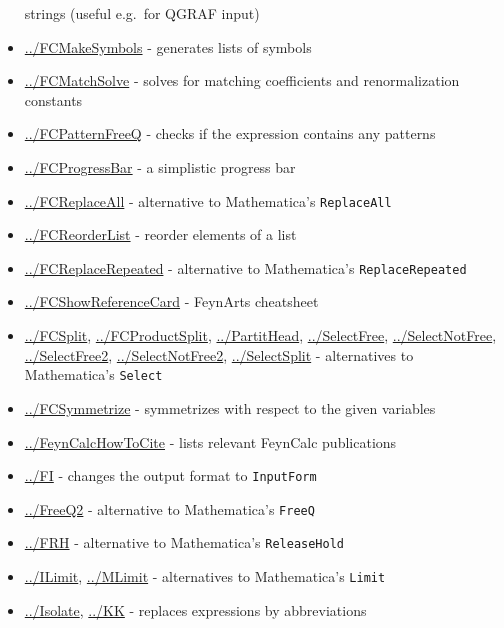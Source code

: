\documentclass[../FeynCalcManual.tex]{subfiles}
\begin{document}
\begin{itemize}
  strings (useful e.g.~for QGRAF input)
\item
  \hyperlink{../fcmakesymbols}{../FCMakeSymbols} - generates lists of
  symbols
\item
  \hyperlink{../fcmatchsolve}{../FCMatchSolve} - solves for matching
  coefficients and renormalization constants
\item
  \hyperlink{../fcpatternfreeq}{../FCPatternFreeQ} - checks if the
  expression contains any patterns
\item
  \hyperlink{../fcprogressbar}{../FCProgressBar} - a simplistic progress
  bar
\item
  \hyperlink{../fcreplaceall}{../FCReplaceAll} - alternative to
  Mathematica's \texttt{ReplaceAll}
\item
  \hyperlink{../fcreorderlist}{../FCReorderList} - reorder elements of a
  list
\item
  \hyperlink{../fcreplacerepeated}{../FCReplaceRepeated} - alternative
  to Mathematica's \texttt{ReplaceRepeated}
\item
  \hyperlink{../fcshowreferencecard}{../FCShowReferenceCard} - FeynArts
  cheatsheet
\item
  \hyperlink{../fcsplit}{../FCSplit},
  \hyperlink{../fcproductsplit}{../FCProductSplit},
  \hyperlink{../partithead}{../PartitHead},
  \hyperlink{../selectfree}{../SelectFree},
  \hyperlink{../selectnotfree}{../SelectNotFree},
  \hyperlink{../selectfree2}{../SelectFree2},
  \hyperlink{../selectnotfree2}{../SelectNotFree2},
  \hyperlink{../selectsplit}{../SelectSplit} - alternatives to
  Mathematica's \texttt{Select}
\item
  \hyperlink{../fcsymmetrize}{../FCSymmetrize} - symmetrizes with
  respect to the given variables
\item
  \hyperlink{../feyncalchowtocite}{../FeynCalcHowToCite} - lists
  relevant FeynCalc publications
\item
  \hyperlink{../fi}{../FI} - changes the output format to
  \texttt{InputForm}
\item
  \hyperlink{../freeq2}{../FreeQ2} - alternative to Mathematica's
  \texttt{FreeQ}
\item
  \hyperlink{../frh}{../FRH} - alternative to Mathematica's
  \texttt{ReleaseHold}
\item
  \hyperlink{../ilimit}{../ILimit}, \hyperlink{../mlimit}{../MLimit} -
  alternatives to Mathematica's \texttt{Limit}
\item
  \hyperlink{../isolate}{../Isolate}, \hyperlink{../kk}{../KK} -
  replaces expressions by abbreviations

\end{itemize}
\end{document}
